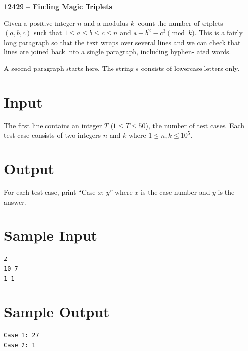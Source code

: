 \documentclass[11pt]{article}
\begin{document}
\begin{center}{\Large\bf 12429 -- Finding Magic Triplets}\end{center}

Given a positive integer $n$ and a modulus $k$, count the number of triplets $(a, b, c)$ such that
$1 \le a \le b \le c \le n$ and $a + b^2 \equiv c^3 \pmod{k}$. This is a fairly long paragraph so that the
text wraps over several lines and we can check that lines are joined back into a single paragraph,
including hyphen-
ated words.

A second paragraph starts here. The string $s$ consists of lowercase letters only.

\section*{Input}
The first line contains an integer $T$ ($1 \le T \le 50$), the number of test cases. Each test case consists of two integers $n$ and $k$ where $1 \le n, k \le 10^5$.

\section*{Output}
For each test case, print ``Case $x$: $y$'' where $x$ is the case number and $y$ is the answer.

\section*{Sample Input}
\begin{verbatim}
2
10 7
1 1
\end{verbatim}

\section*{Sample Output}
\begin{verbatim}
Case 1: 27
Case 2: 1
\end{verbatim}
\end{document}

